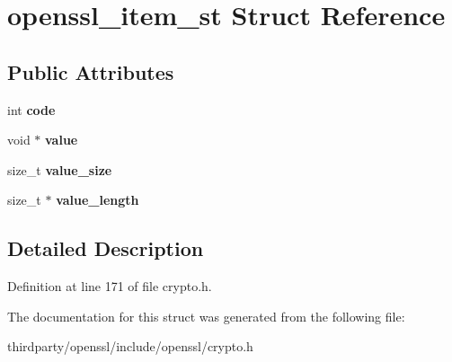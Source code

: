 \hypertarget{structopenssl__item__st}{}\section{openssl\+\_\+item\+\_\+st Struct Reference}
\label{structopenssl__item__st}
\subsection*{Public Attributes}
\begin{DoxyCompactItemize}
\item 
\mbox{\label{structopenssl__item__st_a5e174401dbd1505959e9fab66d07530e}} 
int {\bfseries code}
\item 
\mbox{\label{structopenssl__item__st_a98e9b9c11f757937cee8119f22c3e116}} 
void $\ast$ {\bfseries value}
\item 
\mbox{\label{structopenssl__item__st_ab073a992ed1a5ba36d5e8627ca42e93d}} 
size\+\_\+t {\bfseries value\+\_\+size}
\item 
\mbox{\label{structopenssl__item__st_a1df8749d942642c9a3d867bd574d647a}} 
size\+\_\+t $\ast$ {\bfseries value\+\_\+length}
\end{DoxyCompactItemize}


\subsection{Detailed Description}


Definition at line 171 of file crypto.\+h.



The documentation for this struct was generated from the following file\+:\begin{DoxyCompactItemize}
\item 
thirdparty/openssl/include/openssl/crypto.\+h\end{DoxyCompactItemize}
